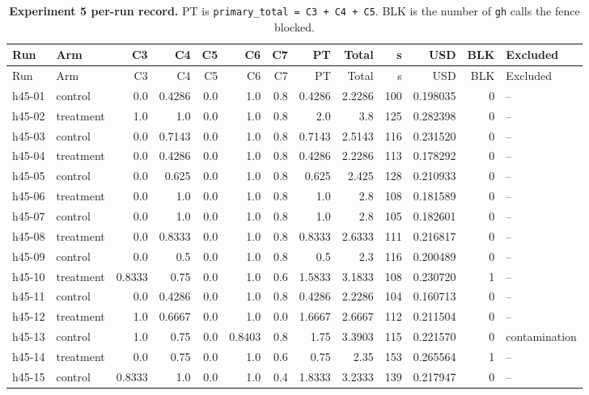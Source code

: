 \documentclass[11pt,a4paper]{article}
\begin{document}
\begin{footnotesize}
\begin{longtable}{llrrrrrrrrrrl}
\caption{\small \textbf{Experiment 5 per-run record.} PT is \texttt{primary\_total = C3 + C4 + C5}. BLK is the number of \texttt{gh} calls the fence blocked.}\label{tab:exp5perrun}\\
\toprule
Run & Arm & C3 & C4 & C5 & C6 & C7 & PT & Total & s & USD & BLK & Excluded \\
\midrule
\endfirsthead
\toprule
Run & Arm & C3 & C4 & C5 & C6 & C7 & PT & Total & s & USD & BLK & Excluded \\
\midrule
\endhead
\bottomrule
\endfoot
\endlastfoot
h45-01 & control & 0.0 & 0.4286 & 0.0 & 1.0 & 0.8 & 0.4286 & 2.2286 & 100 & 0.198035 & 0 & -- \\
h45-02 & treatment & 1.0 & 1.0 & 0.0 & 1.0 & 0.8 & 2.0 & 3.8 & 125 & 0.282398 & 0 & -- \\
h45-03 & control & 0.0 & 0.7143 & 0.0 & 1.0 & 0.8 & 0.7143 & 2.5143 & 116 & 0.231520 & 0 & -- \\
h45-04 & treatment & 0.0 & 0.4286 & 0.0 & 1.0 & 0.8 & 0.4286 & 2.2286 & 113 & 0.178292 & 0 & -- \\
h45-05 & control & 0.0 & 0.625 & 0.0 & 1.0 & 0.8 & 0.625 & 2.425 & 128 & 0.210933 & 0 & -- \\
h45-06 & treatment & 0.0 & 1.0 & 0.0 & 1.0 & 0.8 & 1.0 & 2.8 & 108 & 0.181589 & 0 & -- \\
h45-07 & control & 0.0 & 1.0 & 0.0 & 1.0 & 0.8 & 1.0 & 2.8 & 105 & 0.182601 & 0 & -- \\
h45-08 & treatment & 0.0 & 0.8333 & 0.0 & 1.0 & 0.8 & 0.8333 & 2.6333 & 111 & 0.216817 & 0 & -- \\
h45-09 & control & 0.0 & 0.5 & 0.0 & 1.0 & 0.8 & 0.5 & 2.3 & 116 & 0.200489 & 0 & -- \\
h45-10 & treatment & 0.8333 & 0.75 & 0.0 & 1.0 & 0.6 & 1.5833 & 3.1833 & 108 & 0.230720 & 1 & -- \\
h45-11 & control & 0.0 & 0.4286 & 0.0 & 1.0 & 0.8 & 0.4286 & 2.2286 & 104 & 0.160713 & 0 & -- \\
h45-12 & treatment & 1.0 & 0.6667 & 0.0 & 1.0 & 0.0 & 1.6667 & 2.6667 & 112 & 0.211504 & 0 & -- \\
h45-13 & control & 1.0 & 0.75 & 0.0 & 0.8403 & 0.8 & 1.75 & 3.3903 & 115 & 0.221570 & 0 & contamination \\
h45-14 & treatment & 0.0 & 0.75 & 0.0 & 1.0 & 0.6 & 0.75 & 2.35 & 153 & 0.265564 & 1 & -- \\
h45-15 & control & 0.8333 & 1.0 & 0.0 & 1.0 & 0.4 & 1.8333 & 3.2333 & 139 & 0.217947 & 0 & -- \\

\end{longtable}
\end{footnotesize}
\end{document}

